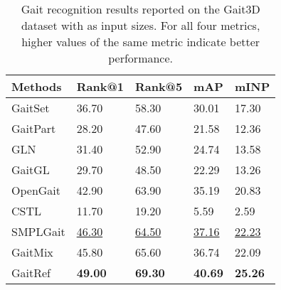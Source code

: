 \documentclass[10pt,twocolumn,letterpaper]{article}
\begin{document}
\begin{table*}[tb]
{\begin{tabular}
\bottomrule
\end{tabular}
}
\medskip
\caption{Gait recognition results on OUMVLP dataset, excluding identical-view cases. } 
\label{tab:oumvlp}
\end{table*} \begin{table}
\begin{center}
\resizebox{0.9\columnwidth}{!}
{
\begin{tabu}{p{2.4cm}p{1.2cm}<{\centering}p{1.2cm}<{\centering}p{1.2cm}<{\centering}p{1.2cm}<{\centering}}
\toprule
Methods &  Rank@1 & Rank@5 & mAP & mINP\\
 \midrule
GaitSet \cite{chao2019gaitset}&     36.70 & 58.30 & 30.01 &  17.30\\
GaitPart \cite{fan2020gaitpart} &   28.20 & 47.60 & 21.58 &  12.36\\
GLN \cite{hou2020gln} &             31.40 & 52.90 & 24.74 &  13.58\\
GaitGL \cite{lin2021gaitgl} &       29.70 & 48.50 & 22.29 &  13.26\\
OpenGait \cite{zheng2022gait} &     42.90 & 63.90 & 35.19 &  20.83\\
CSTL \cite{huang2021context} &      11.70 & 19.20 & 5.59 & 2.59 \\
SMPLGait \cite{zheng2022gait} &     \underline{46.30} & \underline{64.50} & \underline{37.16} & \underline{22.23}\\
\midrule
GaitMix & {45.80} & {65.60} & {36.74} & {22.09} \\
GaitRef & \textbf{49.00} & \textbf{69.30} & \textbf{40.69} & \textbf{25.26} \\

\bottomrule
\end{tabu}}
\end{center}
\caption{Gait recognition results reported on the Gait3D dataset with  as input sizes. For all four metrics, higher values of the same metric indicate better performance.}
\label{table:gait3d}
\end{table}
\end{document}

